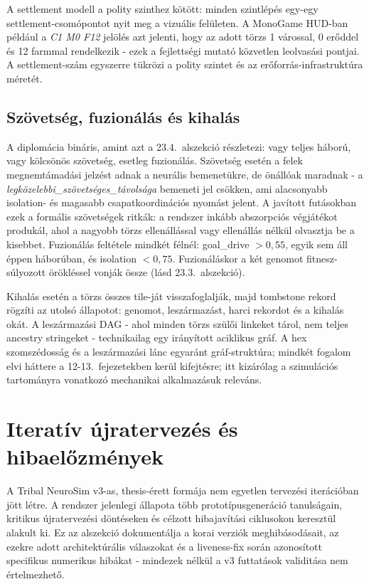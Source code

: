 A settlement modell a polity szinthez kötött: minden szintlépés egy-egy settlement-csomópontot nyit meg a vizuális felületen. A MonoGame HUD-ban például a \textit{C1 M0 F12} jelölés azt jelenti, hogy az adott törzs 1 várossal, 0 erőddel és 12 farmmal rendelkezik - ezek a fejlettségi mutató közvetlen leolvasási pontjai. A settlement-szám egyszerre tükrözi a polity szintet és az erőforrás-infrastruktúra méretét.

\subsection*{Szövetség, fuzionálás és kihalás}

A diplomácia bináris, amint azt a 23.4.~alszekció részletezi: vagy teljes háború, vagy kölcsönös szövetség, esetleg fuzionálás. Szövetség esetén a felek megnemtámadási jelzést adnak a neurális bemenetükre, de önállóak maradnak - a \textit{legközelebbi\_szövetséges\_távolsága} bemeneti jel csökken, ami alacsonyabb isolation- és magasabb csapatkoordinációs nyomást jelent. A javított futásokban ezek a formális szövetségek ritkák: a rendszer inkább abszorpciós végjátékot produkál, ahol a nagyobb törzs ellenállással vagy ellenállás nélkül olvasztja be a kisebbet. Fuzionálás feltétele mindkét félnél: goal\_drive $> 0{,}55$, egyik sem áll éppen háborúban, és isolation $< 0{,}75$. Fuzionáláskor a két genomot fitnesz-súlyozott örökléssel vonják össze (lásd 23.3.~alszekció).

Kihalás esetén a törzs összes tile-ját visszafoglalják, majd tombstone rekord rögzíti az utolsó állapotot: genomot, leszármazást, harci rekordot és a kihalás okát. A leszármazási DAG - ahol minden törzs szülői linkeket tárol, nem teljes ancestry stringeket - technikailag egy irányított aciklikus gráf. A hex szomszédosság és a leszármazási lánc egyaránt gráf-struktúra; mindkét fogalom elvi háttere a 12-13.~fejezetekben kerül kifejtésre; itt kizárólag a szimulációs tartományra vonatkozó mechanikai alkalmazásuk releváns.

\section{Iteratív újratervezés és hibaelőzmények}
\label{sec:neurosim-26-redesign}

A Tribal NeuroSim v3-as, thesis-érett formája nem egyetlen tervezési iterációban jött létre. A rendszer jelenlegi állapota több prototípusgeneráció tanulságain, kritikus újratervezési döntéseken és célzott hibajavítási ciklusokon keresztül alakult ki. Ez az alszekció dokumentálja a korai verziók meghibásodásait, az ezekre adott architektúrális válaszokat és a liveness-fix során azonosított specifikus numerikus hibákat - mindezek nélkül a v3 futtatások validitása nem értelmezhető.


